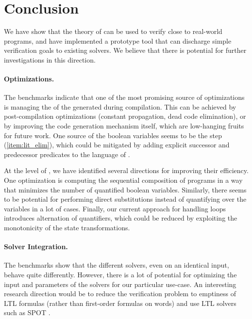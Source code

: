 \section{Conclusion}
\label{sec:conclusion}

We have show that the theory of  can be used to
verify close to real-world programs, and have implemented a prototype tool that
can discharge simple verification goals to existing solvers. We believe that
there is potential for further investigations in this direction.

\paragraph{Optimizations.} The benchmarks indicate that one of the most
promising source of optimizations is managing the  of the
generated  during compilation. This can be achieved by
post-compilation optimizations (constant propagation, dead code elimination),
or by improving the code generation mechanism itself, which are low-hanging
fruits for future work. One source of the boolean variables seems to be the
 step (\ref{item:lit_elim}), which could be
mitigated by adding explicit successor and predecessor predicates to the
language of .

At the level of , we have identified several
directions for improving their efficiency. One optimization is computing the
sequential composition of programs in a way that minimizes the number of
quantified boolean variables. Similarly, there seems to be potential for
performing direct substitutions instead of quantifying over the variables in a
lot of cases. Finally, our current approach for handling loops introduces
alternation of quantifiers, which could be reduced by exploiting the
monotonicity of the state transformations.
    
\paragraph{Solver Integration.} The benchmarks show that the different solvers,
even on an identical input, behave quite differently. However, there is a lot
of potential for optimizing the input and parameters of the solvers for our
particular use-case. An interesting research direction would be to reduce the
verification problem to emptiness of LTL formulas (rather than first-order
formulas on words) and use LTL solvers such as SPOT \cite{SPOT}.

